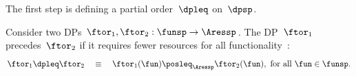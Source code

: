 The first step is defining a partial order~$\dpleq$ on~$\dpsp$.
\begin{definition}
  Consider two DPs $\ftor_{1},\ftor_{2}:\funsp\rightarrow\Aressp$.
  The DP~$\ftor_{1}$ precedes~$\ftor_{2}$ if it requires fewer resources
  for all functionality~\fun:
  \[
    \ftor_{1}\dpleq\ftor_{2}\quad\equiv\quad\ftor_{1}(\fun)\posleq_{\Aressp}\ftor_{2}(\fun),\ \text{for all }\fun\in\funsp.
  \]
\end{definition}

